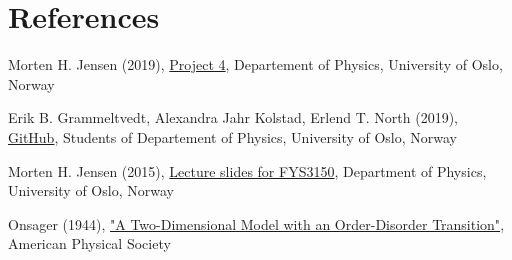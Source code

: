 \documentclass{article}
\begin{document}
\vspace{1cm}

\section{References} \label{sec:References}

\begin{thebibliography}{}

Morten H. Jensen (2019), \href{https://github.com/CompPhysics/ComputationalPhysics/blob/master/doc/Projects/2019/Project4/pdf/Project4.pdf}{Project 4}, Departement of Physics, University of Oslo, Norway

Erik B. Grammeltvedt, Alexandra Jahr Kolstad, Erlend T. North (2019), \href{https://github.com/Erikbgram/Fys3150}{GitHub}, Students of Departement of Physics, University of Oslo, Norway

Morten H. Jensen (2015), \href{https://github.com/CompPhysics/ComputationalPhysics/blob/master/doc/Lectures/lectures2015.pdf}{Lecture slides for FYS3150}, Department of Physics, University of Oslo, Norway

Onsager (1944), \href{https://journals.aps.org/pr/abstract/10.1103/PhysRev.65.117}{"A Two-Dimensional Model with an Order-Disorder Transition"}, American Physical Society


\end{thebibliography}




\end{document}
